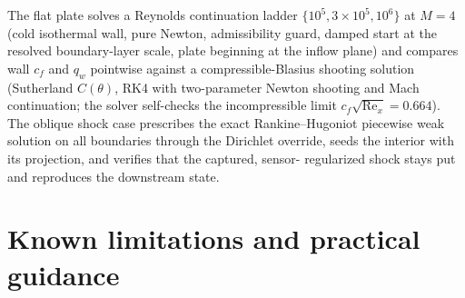 \documentclass[11pt]{article}
\begin{document}
The flat plate solves a Reynolds continuation ladder
$\{10^5, 3\times10^5, 10^6\}$ at $M = 4$ (cold isothermal wall,
pure Newton, admissibility guard, damped start at the resolved
boundary-layer scale, plate beginning at the inflow plane) and compares
wall $c_f$ and $q_w$ pointwise against a compressible-Blasius shooting
solution (Sutherland $C(\theta)$, RK4 with two-parameter Newton
shooting and Mach continuation; the solver self-checks the
incompressible limit $c_f\sqrt{\mathrm{Re}_x} = 0.664$). The oblique
shock case prescribes the exact Rankine--Hugoniot piecewise weak
solution on all boundaries through the Dirichlet override, seeds the
interior with its projection, and verifies that the captured, sensor-
regularized shock stays put and reproduces the downstream state.

\section{Known limitations and practical guidance}
\label{sec:limitations}
\end{document}

